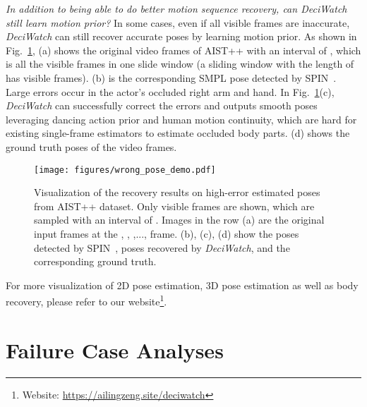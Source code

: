 \documentclass[runningheads]{llncs}
\newcommand{\name}{\emph{DeciWatch}\xspace}
\begin{document}
\emph{In addition to being able to do better motion sequence recovery, can \name still learn motion prior?}
In some cases, even if all visible frames are inaccurate, \name can still recover accurate poses by learning motion prior. As shown in Fig.~\ref{fig:all_wrong_visible}, (a) shows the original video frames of AIST++ with an interval of , which is all the visible frames in one slide window (a sliding window with the length of  has  visible frames). (b) is the corresponding SMPL pose detected by SPIN~\cite{kolotouros2019spin}. Large errors occur in the actor's occluded right arm and hand. In Fig.~\ref{fig:all_wrong_visible}(c), \name can successfully correct the errors and outputs smooth poses leveraging dancing action prior and human motion continuity, which are hard for existing single-frame estimators to estimate occluded body parts. (d) shows the ground truth poses of the video frames.


\begin{figure}[h]	
\centering
 	
 		\begin{minipage}[t]{0.98\linewidth}
 			\centering         
 			\texttt{[image: figures/wrong\_pose\_demo.pdf]}   
 		\end{minipage}
    	
\caption{Visualization of the recovery results on high-error estimated poses from AIST++ dataset. Only visible frames are shown, which are sampled with an interval of . Images in the row (a) are the original input frames at the , , ,..., frame. (b), (c), (d) show the poses detected by SPIN~\cite{kolotouros2019spin}, poses recovered by \name, and the corresponding ground truth. }
\label{fig:all_wrong_visible} 
\end{figure} 

For more visualization of 2D pose estimation, 3D pose estimation as well as body recovery, please refer to our website\footnote{Website: \url{https://ailingzeng.site/deciwatch}}.



\section{Failure Case Analyses}
\label{sec:supp_fail}
\end{document}

